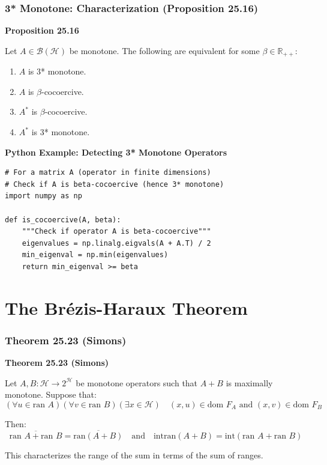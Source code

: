\documentclass[aspectratio=169,10pt]{beamer}
\begin{document}
\begin{frame}[fragile]
  \frametitle{3* Monotone: Characterization (Proposition 25.16)}

  \textbf{Proposition 25.16}

  Let $A \in \mathcal{B}(\mathcal{H})$ be monotone. The following are equivalent for some $\beta \in \mathbb{R}_{++}$:

  \begin{enumerate}
    \item[(i)] $A$ is 3* monotone.
    \item[(ii)] $A$ is $\beta$-cocoercive.
    \item[(iii)] $A^*$ is $\beta$-cocoercive.
    \item[(iv)] $A^*$ is 3* monotone.
  \end{enumerate}

  \vspace{0.3cm}

  \textbf{Python Example: Detecting 3* Monotone Operators}

  \begin{lstlisting}
# For a matrix A (operator in finite dimensions)
# Check if A is beta-cocoercive (hence 3* monotone)
import numpy as np

def is_cocoercive(A, beta):
    """Check if operator A is beta-cocoercive"""
    eigenvalues = np.linalg.eigvals(A + A.T) / 2
    min_eigenval = np.min(eigenvalues)
    return min_eigenval >= beta
  \end{lstlisting}

\end{frame}

\section{The Brézis-Haraux Theorem}

\begin{frame}
  \frametitle{Theorem 25.23 (Simons)}

  \textbf{Theorem 25.23 (Simons)}

  Let $A, B: \mathcal{H} \to 2^{\mathcal{H}}$ be monotone operators such that $A + B$ is maximally monotone. Suppose that:
  $$(\forall u \in \text{ran } A)(\forall v \in \text{ran } B)(\exists x \in \mathcal{H}) \quad (x, u) \in \text{dom } F_A \text{ and } (x, v) \in \text{dom } F_B$$

  Then:
  $$\overline{\text{ran } A + \text{ran } B} = \overline{\text{ran}(A + B)} \quad \text{and} \quad \text{int} \text{ran}(A + B) = \text{int}(\text{ran } A + \text{ran } B)$$

  \vspace{0.3cm}

  This characterizes the range of the sum in terms of the sum of ranges.

\end{frame}
\end{document}
